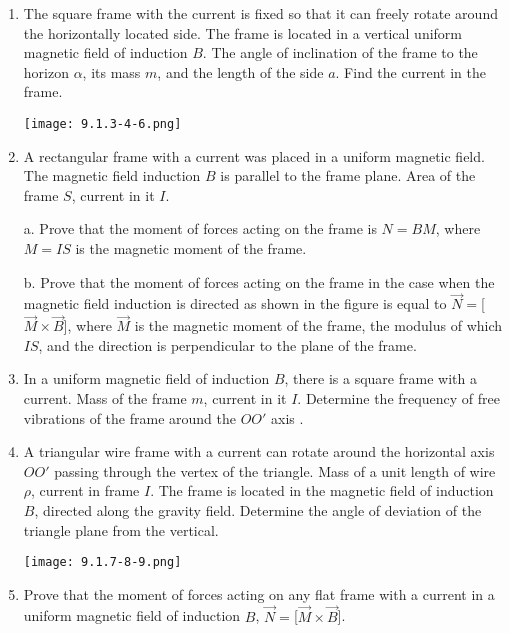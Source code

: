 \documentclass{article}
\begin{document}
\begin{enumerate}[label=9.1.\arabic*]
\item The square frame with the current is fixed so that it can freely rotate around the horizontally located side. The frame is located in a vertical uniform magnetic field of induction $B$. The angle of inclination of the frame to the horizon $\alpha$, its mass $m$, and the length of the side $a$. Find the current in the frame.

\begin{center}
    \texttt{[image: 9.1.3-4-6.png]}
\end{center}


\item A rectangular frame with a current was placed in a uniform magnetic field. The magnetic field induction $B$ is parallel to the frame plane. Area of the frame $S$, current in it $I$.

a. Prove that the moment of forces acting on the frame is $N = BM$, where $M = IS$ is the magnetic moment of the frame. 

b. Prove that the moment of forces acting on the frame in the case when the magnetic field induction is directed as shown in the figure is equal to $\overrightarrow{N} = $[$\overrightarrow{M} \times \overrightarrow{B}$], where $\overrightarrow{M}$ is the magnetic moment of the frame, the modulus of which $IS$, and the direction is perpendicular to the plane of the frame.

\item In a uniform magnetic field of induction $B$, there is a square frame with a current. Mass of the frame $m$, current in it $I$. Determine the frequency of free vibrations of the frame around the $OO'$ axis .

\item A triangular wire frame with a current can rotate around the horizontal axis $OO'$ passing through the vertex of the triangle. Mass of a unit length of wire $\rho$, current in frame $I$. The frame is located in the magnetic field of induction $B$, directed along the gravity field. Determine the angle of deviation of the triangle plane from the vertical.

\begin{center}
    \texttt{[image: 9.1.7-8-9.png]}
\end{center}


\item Prove that the moment of forces acting on any flat frame with a current in a uniform magnetic field of induction $B$, $\overrightarrow{N} = $[$\overrightarrow{M} \times \overrightarrow{B} $].



\end{enumerate}
\end{document}
